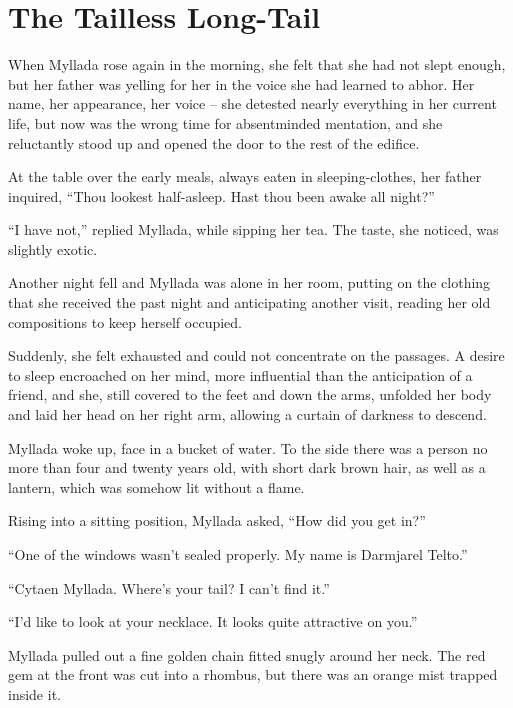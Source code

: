 
\chapter{The Tailless Long-Tail}

When Myllada rose again in the morning, she felt that she had not slept enough, but her father was yelling for her in the voice she had learned to abhor. Her name, her appearance, her voice -- she detested nearly everything in her current life, but now was the wrong time for absentminded mentation, and she reluctantly stood up and opened the door to the rest of the edifice.

At the table over the early meals, always eaten in sleeping-clothes, her father inquired, ``Thou lookest half-asleep. Hast thou been awake all night?''

``I have not,'' replied Myllada, while sipping her tea. The taste, she noticed, was slightly exotic.

\centeredstars

Another night fell and Myllada was alone in her room, putting on the clothing that she received the past night and anticipating another visit, reading her old compositions to keep herself occupied.

Suddenly, she felt exhausted and could not concentrate on the passages. A desire to sleep encroached on her mind, more influential than the anticipation of a friend, and she, still covered to the feet and down the arms, unfolded her body and laid her head on her right arm, allowing a curtain of darkness to descend.

\centeredstars

Myllada woke up, face in a bucket of water. To the side there was a person no more than four and twenty years old, with short dark brown hair, as well as a lantern, which was somehow lit without a flame.

Rising into a sitting position, Myllada asked, ``How did you get in?''

``One of the windows wasn't sealed properly. My name is Darmjarel Telto.''

``Cytaen Myllada. Where's your tail? I can't find it.''

``I'd like to look at your necklace. It looks quite attractive on you.''

Myllada pulled out a fine golden chain fitted snugly around her neck. The red gem at the front was cut into a rhombus, but there was an orange mist trapped inside it.

